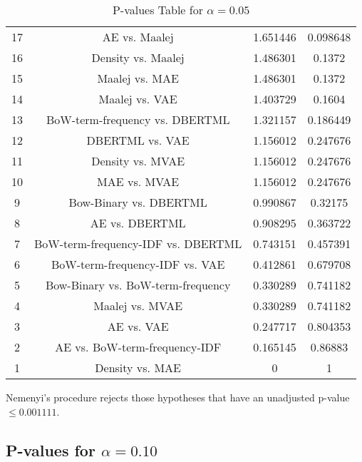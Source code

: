 \documentclass[a4paper,10pt]{article}
\begin{document}
\begin{landscape}
\begin{table}[!htp]
\begin{tabular}{cccc}
17&AE vs. Maalej&1.651446&0.098648\\
16&Density vs. Maalej&1.486301&0.1372\\
15&Maalej vs. MAE&1.486301&0.1372\\
14&Maalej vs. VAE&1.403729&0.1604\\
13&BoW-term-frequency vs. DBERTML&1.321157&0.186449\\
12&DBERTML vs. VAE&1.156012&0.247676\\
11&Density vs. MVAE&1.156012&0.247676\\
10&MAE vs. MVAE&1.156012&0.247676\\
9&Bow-Binary vs. DBERTML&0.990867&0.32175\\
8&AE vs. DBERTML&0.908295&0.363722\\
7&BoW-term-frequency-IDF vs. DBERTML&0.743151&0.457391\\
6&BoW-term-frequency-IDF vs. VAE&0.412861&0.679708\\
5&Bow-Binary vs. BoW-term-frequency&0.330289&0.741182\\
4&Maalej vs. MVAE&0.330289&0.741182\\
3&AE vs. VAE&0.247717&0.804353\\
2&AE vs. BoW-term-frequency-IDF&0.165145&0.86883\\
1&Density vs. MAE&0&1\\
\hline
\end{tabular}
\caption{P-values Table for $\alpha=0.05$}
\end{table}Nemenyi's procedure rejects those hypotheses that have an unadjusted p-value $\le0.001111$.

\pagebreak

\subsection{P-values for $\alpha=0.10$}


\end{landscape}
\end{document}
